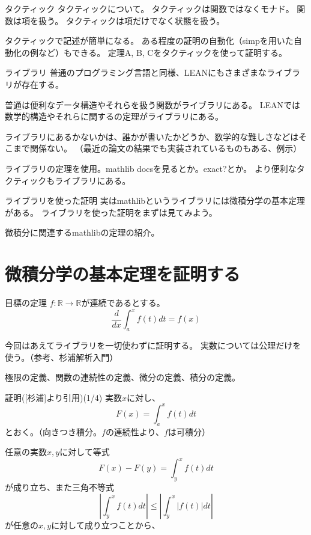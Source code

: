 \documentclass[unicode,12pt]{beamer}%
\begin{document}
\begin{frame}{タクティック}
  タクティックについて。
  タクティックは関数ではなくモナド。
  関数は項を扱う。
  タクティックは項だけでなく状態を扱う。

  タクティックで記述が簡単になる。
  ある程度の証明の自動化（simpを用いた自動化の例など）もできる。
  定理A, B, Cをタクティックを使って証明する。
\end{frame}

\begin{frame}{ライブラリ}
  普通のプログラミング言語と同様、LEANにもさまざまなライブラリが存在する。

  普通は便利なデータ構造やそれらを扱う関数がライブラリにある。
  LEANでは数学的構造やそれらに関するの定理がライブラリにある。

  ライブラリにあるかないかは、誰かが書いたかどうか、数学的な難しさなどはそこまで関係ない。
  （最近の論文の結果でも実装されているものもある、例示）

  ライブラリの定理を使用。mathlib docsを見るとか。exact?とか。
  より便利なタクティックもライブラリにある。
\end{frame}

\begin{frame}{ライブラリを使った証明}
  実はmathlibというライブラリには微積分学の基本定理がある。
  ライブラリを使った証明をまずは見てみよう。
\end{frame}

\begin{frame}
  微積分に関連するmathlibの定理の紹介。
\end{frame}

\section{微積分学の基本定理を証明する}

\begin{frame}{目標の定理}
  $f:\mathbb{R}\to\mathbb{R}$が連続であるとする。
  $$
  \frac{d}{dx}\int^x_af(t)dt=f(x)
  $$

  今回はあえてライブラリを一切使わずに証明する。
  実数については公理だけを使う。（参考、杉浦解析入門）
\end{frame}

\begin{frame}
  極限の定義、関数の連続性の定義、微分の定義、積分の定義。
\end{frame}

\begin{frame}{証明([杉浦]より引用)(1/4)}
  実数$x$に対し、
  $$
    F(x)=\int^x_af(t)dt
  $$
  とおく。（向きつき積分。$f$の連続性より、$f$は可積分）

  任意の実数$x, y$に対して等式
  $$
  F(x)-F(y)=\int^x_yf(t)dt
  $$
  が成り立ち、また三角不等式
  $$
  \left\lvert\int^x_yf(t)dt\right\rvert\leq\left\lvert\int^x_y\lvert f(t)\rvert dt\right\rvert
  $$
  が任意の$x, y$に対して成り立つことから、
\end{frame}
\end{document}

